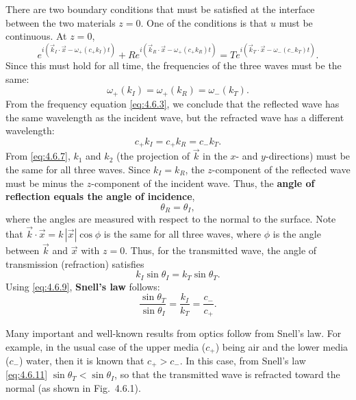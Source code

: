 There are two boundary conditions that must be satisfied at the interface between the two materials $z = 0$.  One of the conditions is that $u$ must be continuous.  At $z = 0$,
\begin{equation}
e^{i(\vec{k}_I\cdot\vec{x} - \omega_+(c_+ k_I)t)} + Re^{i(\vec{k}_R\cdot\vec{x} - \omega_+(c_+ k_R)t)} = Te^{i(\vec{k}_T\cdot\vec{x} - \omega_-(c_- k_T)t)}.
\label{eq:4.6.7}
\end{equation}
Since this must hold for all time, the frequencies of the three waves must be the same:
\begin{equation}
\omega_+(k_I) = \omega_+(k_R) = \omega_-(k_T).
\label{eq:4.6.8}
\end{equation}
From the frequency equation \eqref{eq:4.6.3}, we conclude that the reflected wave has the same wavelength as the incident wave, but the refracted wave has a different wavelength:
\begin{equation}
c_+ k_I = c_+ k_R = c_- k_T.
\label{eq:4.6.9}
\end{equation}
From \eqref{eq:4.6.7}, $k_1$ and $k_2$ (the projection of $\vec{k}$ in the $x$- and $y$-directions) must be the same for all three waves.  Since $k_I = k_R$, the $z$-component of the reflected wave must be minus the $z$-component of the incident wave.  Thus, the \textbf{angle of reflection equals the angle of incidence},
\begin{equation}
\theta_R = \theta_I,
\label{eq:4.6.10}
\end{equation}
where the angles are measured with respect to the normal to the surface.  Note that $\vec{k}\cdot\vec{x} = k\,|\vec{x}|\cos\phi$ is the same for all three waves, where $\phi$ is the angle between $\vec{k}$ and $\vec{x}$ with $z = 0$.  Thus, for the transmitted wave, the angle of transmission (refraction) satisfies
\[
k_I\sin\theta_I = k_T\sin\theta_T.
\]
Using \eqref{eq:4.6.9}, \textbf{Snell's law} follows:
\begin{equation}
\boxed{\frac{\sin\theta_T}{\sin\theta_I} = \frac{k_I}{k_T} = \frac{c_-}{c_+}.}
\label{eq:4.6.11}
\end{equation}

Many important and well-known results from optics follow from Snell's law.  For example, in the usual case of the upper media ($c_+$) being air and the lower media ($c_-$) water, then it is known that $c_+ > c_-$.  In this case, from Snell's law \eqref{eq:4.6.11} $\sin\theta_T < \sin\theta_I$, so that the transmitted wave is refracted toward the normal (as shown in Fig.~4.6.1).

